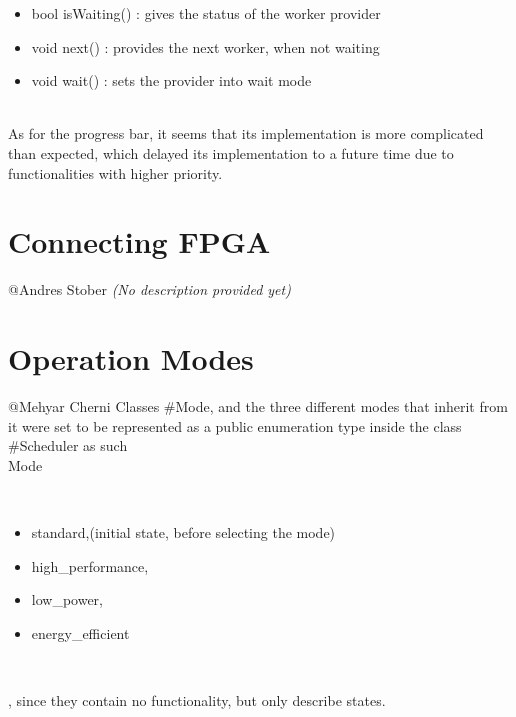 \documentclass[parskip=full]{scrartcl}
\newcommand\tab[1][1cm]{\hspace*{#1}}
\begin{document}
	\begin {itemize}
		\item bool isWaiting() : gives the status of the worker provider
		\item void next() : provides the next worker, when not waiting
		\item void wait() : sets the provider into wait mode
	\end{itemize}
\\As for the progress bar, it seems that its implementation is more complicated than expected, which delayed its implementation to a future time due to functionalities with higher priority.
	
	
\pagebreak

\section{Connecting FPGA} \label{Connecting FPGA}
	@Andres Stober \textit{(No description provided yet)}
	

\pagebreak



\pagebreak

\section{Operation Modes} \label{Operation Modes}
	@Mehyar Cherni
	\tab Classes #Mode, and the three different modes that inherit from it were set to be represented as a public enumeration type inside the class #Scheduler as such \\ Mode { \\
	\begin {itemize}
		\item standard,(initial state, before selecting the mode)
		\item high_performance, 
		\item low_power,
		\item energy_efficient
	\end{itemize}  \\
	} , since they contain no functionality, but only describe states.


\pagebreak
\end{document}
